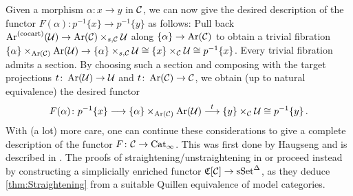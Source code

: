 \begin{numpar}
	Given a morphism $\alpha\colon x\rightarrow y$ in $\mathcal{C}$, we can now give the desired description of the functor $F(\alpha)\colon p^{-1}\{x\}\rightarrow p^{-1}\{y\}$ as follows: Pull back $\operatorname{Ar}^{(\mathrm{cocart})}(\mathcal{U})\rightarrow \operatorname{Ar}(\mathcal{C})\times_{s,\mathcal{C}}\mathcal{U}$ along $\{\alpha\}\rightarrow \operatorname{Ar}(\mathcal{C})$ to obtain a trivial fibration $\{\alpha\}\times_{\operatorname{Ar}(\mathcal{C})}\operatorname{Ar}(\mathcal{U})\rightarrow \{\alpha\}\times_{s,\mathcal{C}}\mathcal{U}\cong \{x\}\times_{\mathcal{C}}\mathcal{U}\cong p^{-1}\{x\}$. Every trivial fibration admits a section. By choosing such a section and composing with the target projections $t\colon \operatorname{Ar}(\mathcal{U})\rightarrow \mathcal{U}$ and $t\colon \operatorname{Ar}(\mathcal{C})\rightarrow \mathcal{C}$, we obtain (up to natural equivalence) the desired functor
	\begin{equation*}
		F(\alpha)\colon p^{-1}\{x\}\longrightarrow \{\alpha\}\times_{\operatorname{Ar}(\mathcal{C})}\operatorname{Ar}(\mathcal{U})\overset{t}{\longrightarrow} \{y\}\times_{\mathcal{C}}\mathcal{U}\cong p^{-1}\{y\}\,.
	\end{equation*}	
	With (a lot) more care, one can continue these considerations to give a complete description of the functor $F\colon \mathcal{C}\rightarrow \mathrm{Cat}_\infty$. This was first done by Haugseng and is described in \cite[\S3.3]{Land}. The proofs of straightening/unstraightening in \cite{HeutsStraightening} or \cite[\S\href{https://people.math.harvard.edu/~lurie/papers/HTT.pdf\#section.3.2}{3.2}]{HTT} proceed instead by constructing a simplicially enriched functor $\mathfrak{C}[\mathcal{C}]\rightarrow \mathrm{sSet}^\Delta$, as they deduce \cref{thm:Straightening} from a suitable Quillen equivalence of model categories.
\end{numpar}
